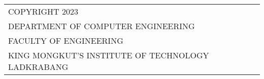 \begin{comment}
\end{comment}

\begin{titlepage}



\vfill
\par
\renewcommand{\arraystretch}{1.5}
\begin{table}[H]
\begin{tabular}{l}
{  \uppercase{COPYRIGHT 2023}} \\
{  \uppercase{DEPARTMENT OF COMPUTER ENGINEERING}}\\
{  \uppercase{FACULTY OF ENGINEERING}} \\ 
{  \uppercase{KING MONGKUT'S INSTITUTE OF TECHNOLOGY LADKRABANG}} \\ 
\end{tabular}
\end{table}
\par


\end{titlepage}
\cleardoublepage
